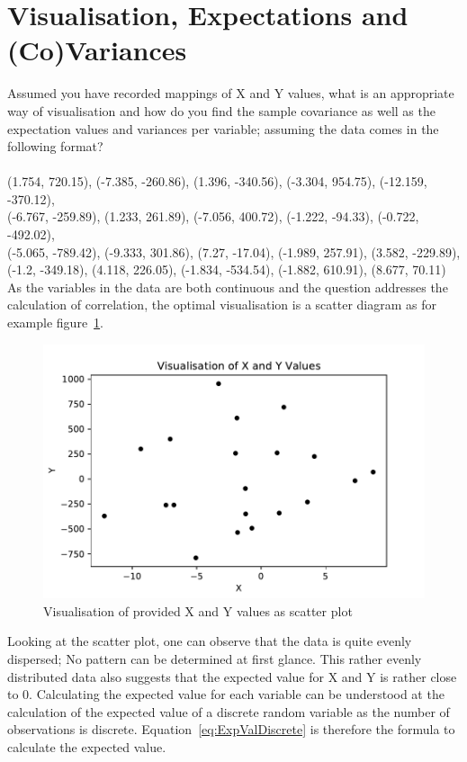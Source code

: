 \section{Visualisation, Expectations and (Co)Variances}
Assumed you have recorded mappings of X and Y values, what is an appropriate way of visualisation and how do you find the sample covariance as well as the expectation values and variances per variable; assuming the data comes in the following format?\\
\\
(1.754, 720.15), (-7.385, -260.86), (1.396, -340.56), (-3.304, 954.75), 
(-12.159, -370.12),\\ (-6.767, -259.89), (1.233, 261.89), (-7.056, 400.72), 
(-1.222, -94.33), (-0.722, -492.02),\\ (-5.065, -789.42), (-9.333, 301.86), 
(7.27, -17.04), (-1.989, 257.91), (3.582, -229.89), \\(-1.2, -349.18), 
(4.118, 226.05), (-1.834, -534.54), (-1.882, 610.91), (8.677, 70.11) \\

As the variables in the data are both continuous and the question addresses the calculation of correlation, the optimal visualisation is a scatter diagram as for example figure~\ref{fig:WorkbookAssignment2a}.

\begin{figure}[h]
\centering
\includegraphics[width=16cm]{pics/WorkbookAssignment2a.pdf}
\caption{Visualisation of provided X and Y values as scatter plot}
\label{fig:WorkbookAssignment2a}
\end{figure}
\FloatBarrier

Looking at the scatter plot, one can observe that the data is quite evenly dispersed; No pattern can be determined at first glance. This rather evenly distributed data also suggests that the expected value for X and Y is rather close to 0. Calculating the expected value for each variable can be understood at the calculation of the expected value of a discrete random variable as the number of observations is discrete. Equation~\ref{eq:ExpValDiscrete} is therefore the formula to calculate the expected value. 


